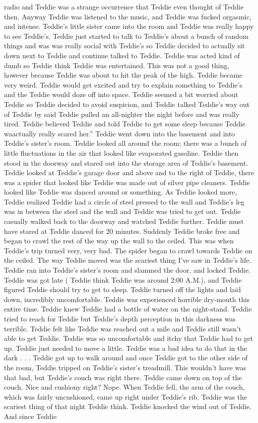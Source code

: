 \documentclass[12pt]{book}
\begin{document}
radio and Teddie was a strange occurrence that Teddie even thought of Teddie then. Anyway Teddie was listened to the music, and Teddie was fucked orgasmic, and intense. Teddie's little sister came into the room and Teddie was really happy to see Teddie's. Teddie just started to talk to Teddie's about a bunch of random things and was was really social with Teddie's so Teddie decided to actually sit down next to Teddie and continue talked to Teddie. Teddie was acted kind of dumb so Teddie think Teddie was entertained. This was not a good thing, however because Teddie was about to hit the peak of the high. Teddie became very weird. Teddie would get excited and try to explain something to Teddie's and the Teddie would doze off into space. Teddie seemed a bit worried about Teddie so Teddie decided to avoid suspicion, and Teddie talked Teddie's way out of Teddie by said Teddie pulled an all-nighter the night before and was really tired. Teddie believed Teddie and told Teddie to get some sleep because Teddie waactually really scared her.'' Teddie went down into the basement and into Teddie's sister's room. Teddie looked all around the room; there was a bunch of little fluctuations in the air that looked like evaporated gasoline. Teddie then stood in the doorway and stared out into the storage area of Teddie's basement. Teddie looked at Teddie's garage door and above and to the right of Teddie, there was a spider that looked like Teddie was made out of silver pipe cleaners. Teddie looked like Teddie was danced around or something. As Teddie looked more, Teddie realized Teddie had a circle of steel pressed to the wall and Teddie's leg was in between the steel and the wall and Teddie was tried to get out. Teddie casually walked back to the doorway and watched Teddie further. Teddie must have stared at Teddie danced for 20 minutes. Suddenly Teddie broke free and began to crawl the rest of the way up the wall to the ceiled. This was when Teddie's trip turned very, very bad. The spider began to crawl towards Teddie on the ceiled. The way Teddie moved was the scariest thing I've saw in Teddie's life. Teddie ran into Teddie's sister's room and slammed the door, and locked Teddie. Teddie was got late ( Teddie think Teddie was around 2:00 A.M.), and Teddie figured Teddie should try to get to sleep. Teddie turned off the lights and laid down, incredibly uncomfortable. Teddie was experienced horrible dry-mouth this entire time. Teddie knew Teddie had a bottle of water on the night-stand. Teddie tried to reach for Teddie but Teddie's depth perception in this darkness was terrible. Teddie felt like Teddie was reached out a mile and Teddie still wasn't able to get Teddie. Teddie was so uncomfortable and itchy that Teddie had to get up. Teddie just needed to move a little. Teddie was a bad idea to do that in the dark . . .  Teddie got up to walk around and once Teddie got to the other side of the room, Teddie tripped on Teddie's sister's treadmill. This wouldn't have was that bad, but Teddie's couch was right there. Teddie came down on top of the couch. Nice and cushiony right? Nope. When Teddie fell, the arm of the couch, which was fairly uncushioned, came up right under Teddie's rib. Teddie was the scariest thing of that night Teddie think. Teddie knocked the wind out of Teddie. And since Teddie 
\end{document}
